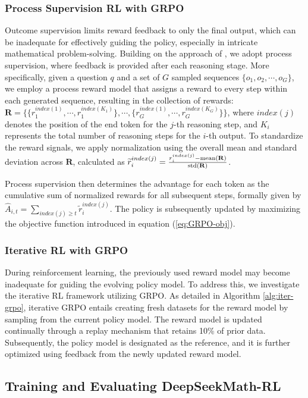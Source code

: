 \begin{itemize}[topsep=0pt]
\begin{itemize}[topsep=0pt]
\subsubsection{Process Supervision RL with GRPO} Outcome supervision limits reward feedback to only the final output, which can be inadequate for effectively guiding the policy, especially in intricate mathematical problem-solving. Building on the approach of \cite{wang2023math}, we adopt process supervision, where feedback is provided after each reasoning stage. More specifically, given a question $q$ and a set of $G$ sampled sequences $\{o_1, o_2, \cdots, o_G\}$, we employ a process reward model that assigns a reward to every step within each generated sequence, resulting in the collection of rewards: $\mathbf{R} = \{ \{r_1^{index(1)},\cdots,r_1^{index(K_1)}\}, \cdots,  \{r_G^{index(1)},\cdots,r_G^{index(K_G)}\} \}$, where $index(j)$ denotes the position of the end token for the $j$-th reasoning step, and $K_i$ represents the total number of reasoning steps for the $i$-th output. To standardize the reward signals, we apply normalization using the overall mean and standard deviation across $\mathbf{R}$, calculated as $\widetilde{r}_i^{index(j)} = \frac{r_i^{index(j)} - {\rm mean(\mathbf{R})}}{{\rm std(\mathbf{R})}}$.

Process supervision then determines the advantage for each token as the cumulative sum of normalized rewards for all subsequent steps, formally given by $\hat{A}_{i, t} = \sum_{index(j) \ge t} \widetilde{r}_i^{index(j)}$. The policy is subsequently updated by maximizing the objective function introduced in equation (\ref{eq:GRPO-obj}).

\subsubsection{Iterative RL with GRPO} During reinforcement learning, the previously used reward model may become inadequate for guiding the evolving policy model. To address this, we investigate the iterative RL framework utilizing GRPO. As detailed in Algorithm \ref{alg:iter-grpo}, iterative GRPO entails creating fresh datasets for the reward model by sampling from the current policy model. The reward model is updated continually through a replay mechanism that retains 10\% of prior data. Subsequently, the policy model is designated as the reference, and it is further optimized using feedback from the newly updated reward model.

\subsection{Training and Evaluating DeepSeekMath-RL}


\end{itemize}
\end{itemize}

